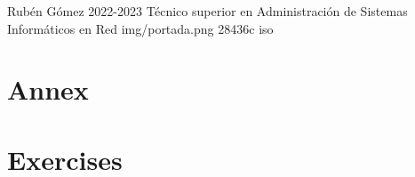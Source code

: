 \documentclass{\ClassPath/yukibook}
\begin{document}
    {Rubén Gómez}  %
    {2022-2023}    %
    {Técnico superior en Administración de \linebreak Sistemas Informáticos en Red} %
    {}%
    {}%
    {img/portada.png} %
    {28436c}
    {iso} %

    \coverpage

    \tableofcontents

    \graphicspath{{../../../temas_comunes/sistemas_de_numeracion/img/}}
    

    \graphicspath{{../../../temas_comunes/unidades_informacion/img/}}
    


    \graphicspath{{../../../DAM/1/sistemas_informaticos/img/si}}
    

    


    \graphicspath{{img/iso/}}
    

    \part{Annex}
    

    \part{Exercises}
    
\end{document}
